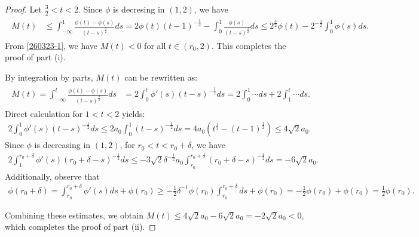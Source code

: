 \documentclass{amsart}
\numberwithin{equation}{section}
\newcommand{\de}{\delta}
\begin{document}
\begin{proof}
Let $ \frac32 <t<2$.  Since $ \phi$ is decresing in $(1,2)$, we have 
\begin{align*} 
\begin{split}
M(t)   & \leq     \int_{-\infty}^1 \frac{\phi(t) -\phi(s)}{(t -s)^\frac32} ds 
=   2 \phi(t) (t -1)^{-\frac12}  
- \int_0^1 \frac{ \phi(s)}{(t -s)^\frac32} ds 
\leq  2^\frac32 \phi(t) 
-  2^{-\frac32} \int_0^1   \phi(s)  ds. 
\end{split}
\end{align*}
From \eqref{260323-1}, we have  $M(t) < 0$ for all $t \in (r_0, 2)$. This completes the proof of part (i).


 
 
By integration by parts, $M(t)$ can be rewritten as:
 \begin{align*}%
\begin{split}
M(t) = \int_{-\infty}^t  \frac{  \phi(t) - \phi(s)  }{(t-s)^\frac32}  ds  
& =   2\int_{0}^t   \phi' (s)     (t-s)^{-\frac12}  ds= 2 \int_0^1 \cdots ds + 2\int_1^t \cdots ds.
\end{split}
\end{align*}
Direct calculation for $1 < t < 2$ yields:
\begin{align*}
2\int_{0}^1   \phi' (s)     (t-s)^{-\frac12}  ds \leq 2a_0 \int_0^1    (t-s)^{-\frac12}  ds = 4a_0( t^\frac12 -(t-1)^\frac12 )
\leq 4 \sqrt{2}a_0.
\end{align*}
 Since  $ \phi$ is decreasing in $(1,2)$, for $ r_0 < t< r_0 +\de$,  we have 
\begin{align*}
2\int_1^{r_0 +\de}  \phi' (s)     (r_0 +\de -s)^{-\frac12}  ds  \leq -3 \sqrt{2} \de^{-\frac12} a_0 \int_{r_0}^{r_0 +\de}       (r_0 +\de-s)^{-\frac12}  ds
=- 6 \sqrt{2}  a_0.
\end{align*}
Additionally, observe that
\begin{align*}
\phi(r_0 +\de) =\int_{r_0}^{r_0 +\de} \phi'(s) ds +\phi(r_0) \geq  -\frac12 \de^{-1} \phi(r_0)\int_{r_0}^{r_0 +\de}   ds +\phi(r_0) 
=  -\frac12  \phi(r_0)  +\phi(r_0) =\frac12 \phi(r_0).
\end{align*}

 

Combining these estimates, we obtain $M(t) \leq 4\sqrt{2} a_0 - 6\sqrt{2} a_0 = -2\sqrt{2} a_0 < 0$, which completes the proof of part (ii).


\end{proof}
\end{document}
